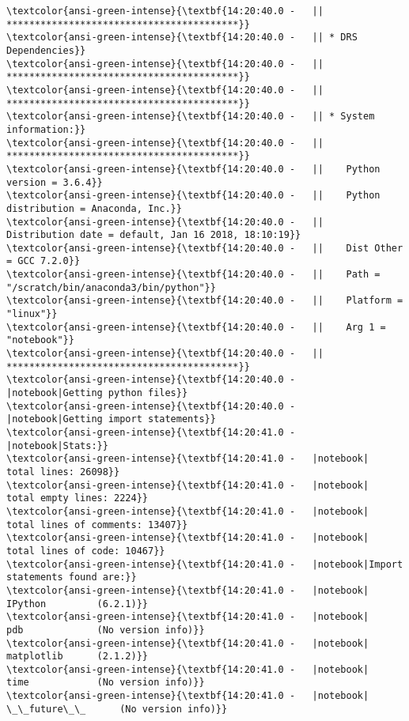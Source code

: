 \documentclass[11pt]{article}
\begin{document}
    \begin{Verbatim}[commandchars=\\\{\}]
\textcolor{ansi-green-intense}{\textbf{14:20:40.0 -   || *****************************************}}
\textcolor{ansi-green-intense}{\textbf{14:20:40.0 -   || * DRS Dependencies}}
\textcolor{ansi-green-intense}{\textbf{14:20:40.0 -   || *****************************************}}
\textcolor{ansi-green-intense}{\textbf{14:20:40.0 -   || *****************************************}}
\textcolor{ansi-green-intense}{\textbf{14:20:40.0 -   || * System information:}}
\textcolor{ansi-green-intense}{\textbf{14:20:40.0 -   || *****************************************}}
\textcolor{ansi-green-intense}{\textbf{14:20:40.0 -   ||    Python version = 3.6.4}}
\textcolor{ansi-green-intense}{\textbf{14:20:40.0 -   ||    Python distribution = Anaconda, Inc.}}
\textcolor{ansi-green-intense}{\textbf{14:20:40.0 -   ||    Distribution date = default, Jan 16 2018, 18:10:19}}
\textcolor{ansi-green-intense}{\textbf{14:20:40.0 -   ||    Dist Other = GCC 7.2.0}}
\textcolor{ansi-green-intense}{\textbf{14:20:40.0 -   ||    Path = "/scratch/bin/anaconda3/bin/python"}}
\textcolor{ansi-green-intense}{\textbf{14:20:40.0 -   ||    Platform = "linux"}}
\textcolor{ansi-green-intense}{\textbf{14:20:40.0 -   ||    Arg 1 = "notebook"}}
\textcolor{ansi-green-intense}{\textbf{14:20:40.0 -   || *****************************************}}
\textcolor{ansi-green-intense}{\textbf{14:20:40.0 -   |notebook|Getting python files}}
\textcolor{ansi-green-intense}{\textbf{14:20:40.0 -   |notebook|Getting import statements}}
\textcolor{ansi-green-intense}{\textbf{14:20:41.0 -   |notebook|Stats:}}
\textcolor{ansi-green-intense}{\textbf{14:20:41.0 -   |notebook|	total lines: 26098}}
\textcolor{ansi-green-intense}{\textbf{14:20:41.0 -   |notebook|	total empty lines: 2224}}
\textcolor{ansi-green-intense}{\textbf{14:20:41.0 -   |notebook|	total lines of comments: 13407}}
\textcolor{ansi-green-intense}{\textbf{14:20:41.0 -   |notebook|	total lines of code: 10467}}
\textcolor{ansi-green-intense}{\textbf{14:20:41.0 -   |notebook|Import statements found are:}}
\textcolor{ansi-green-intense}{\textbf{14:20:41.0 -   |notebook|	IPython         (6.2.1)}}
\textcolor{ansi-green-intense}{\textbf{14:20:41.0 -   |notebook|	pdb             (No version info)}}
\textcolor{ansi-green-intense}{\textbf{14:20:41.0 -   |notebook|	matplotlib      (2.1.2)}}
\textcolor{ansi-green-intense}{\textbf{14:20:41.0 -   |notebook|	time            (No version info)}}
\textcolor{ansi-green-intense}{\textbf{14:20:41.0 -   |notebook|	\_\_future\_\_      (No version info)}}

\end{Verbatim}
\end{document}
